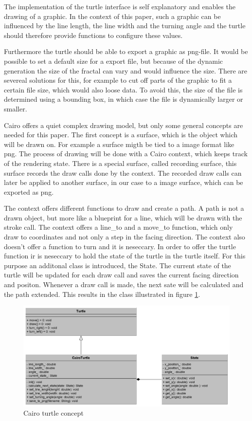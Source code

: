 \documentclass[english]{cpp-hmwk}
\begin{document}
The implementation of the turtle interface is self explanatory and enables the drawing of a graphic. In the context of this paper, such a graphic can be influenced by the line length, the line width and the turning angle and the turtle should therefore provide functions to configure these values.

Furthermore the turtle should be able to export a graphic as png-file. It would be possible to set a default size for a export file, but because of the dynamic generation the size of the fractal can vary and would influence the size. There are severeal solutions for this, for example to cut off parts of the graphic to fit a certain file size, which would also loose data. To avoid this, the size of the file is determined using a bounding box, in which case the file is dynamically larger or smaller.\newline

\noindent Cairo offers a quiet complex drawing model, but only some general concepts are needed for this paper. The first concept is a surface, which is the object which will be drawn on. For example a surface migth be tied to a image format like png. The process of drawing will be done with a Cairo context, which keeps track of the rendering state. There is a special surface, called recording surface, this surface records the draw calls done by the context. The recorded draw calls can later be applied to another surface, in our case to a image surface, which can be exported as png.

The context offers different functions to draw and create a path. A path is not a drawn object, but more like a blueprint for a line, which will be drawn with the stroke call. The context offers a line\_to and a move\_to function, which only draw to coordinates and not only a step in the facing direction. The context also doesn't offer a function to turn and it is neseccary. In order to offer the turtle function ir is neseccary to hold the state of the turtle in the turtle itself. For this purpose an additonal class is introduced, the State. The current state of the turtle will be updated for each draw call and saves the current facing direction and positon. Whenever a draw call is made, the next sate will be calculated and the path extended. This results in the class illustrated in figure \ref{figure:cairoturtle}.

\begin{figure}[h!]
	\centering
	\includegraphics[width=1\columnwidth]{../graphs/class_cairo_turtle.png}
	\caption{Cairo turtle concept}
	\label{figure:cairoturtle}
\end{figure}
\end{document}
